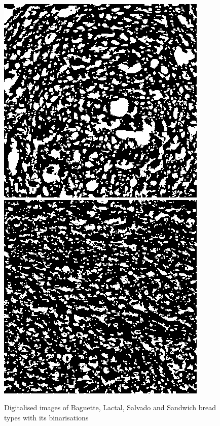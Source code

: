 \documentclass[oneside,a4paper,english,links]{amca}
\begin{document}
\begin{figure}[htb]
\includegraphics[scale=0.333]{imagenes/salvado43bin}
\includegraphics[scale=0.333]{imagenes/sandwich43bin}
\caption{Digitalised images of Baguette, Lactal, Salvado and Sandwich bread types with its binarisations}
\label{fig:bread}
\end{figure}
\end{document}
